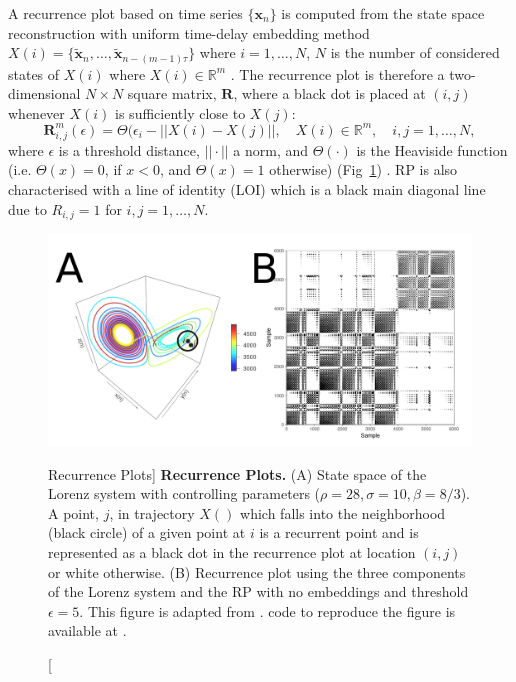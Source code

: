 A recurrence plot based on time series $\{ \boldsymbol{x}_n \}$ is computed 
from the state space reconstruction with uniform time-delay embedding method 
$X(i)=\{ \boldsymbol{ \tilde{x} }_n, \dots,  
\boldsymbol{ \tilde{x} }_{n -(m-1)\tau} \}$
where $i=1,\dots,N$, $N$ is the number of considered states of $X(i)$ 
where $X(i) \in \mathbb{R}^m$ \citep{eckmann1987}.
The recurrence plot is therefore a two-dimensional $N \times N$ square matrix, 
$\mathbf{R}$, where a black dot is placed at $(i,j)$ whenever $X(i)$ is 
sufficiently close to $X(j)$: 
\begin{equation}
\mathbf{R}^{m}_{i,j} (\epsilon) = 
	\Theta ( \epsilon_i - || X(i) - X(j) ||, \quad 
	X(i) \in \mathbb{R}^m, \quad i,j=1,\dots,N,
\end{equation}
where $\epsilon$ is a 
threshold distance, $|| \cdotp ||$ a norm, and $\Theta(\cdotp)$ is the 
Heaviside function (i.e. $\Theta(x)=0$, if $x<0$, and $\Theta(x)=1$ otherwise) 
(Fig~\ref{fig:mrp}) \citep{eckmann1987, marwan2007,marwan2015}.
RP is also characterised with a line of identity (LOI) which is a black main 
diagonal line due to $ R_{i,j}=1$ for $i,j=1,\dots,N$. 
\begin{figure}[!h]
  \centering
    \includegraphics[width=1.0\textwidth]{fig_3_05}
    \caption
	[Recurrence Plots]{
	{\bf Recurrence Plots.} 
	(A) State space of the Lorenz system with controlling parameters 
	($\rho=28, \sigma=10, \beta=8/3$). A point, $j$, in trajectory $X()$ 
	which falls into the neighborhood (black circle) of a given point 
	at $i$ is a recurrent point and is represented as a black dot in 
	the recurrence plot at location $(i, j)$ or white otherwise.
	(B) Recurrence plot using the three components of the Lorenz 
	system and the RP with no embeddings and threshold $\epsilon=5$.
	This figure is adapted from \cite{marwan2015}.
	\R code to reproduce the figure is available at 
	.
	}
    \label{fig:mrp}
\end{figure}


